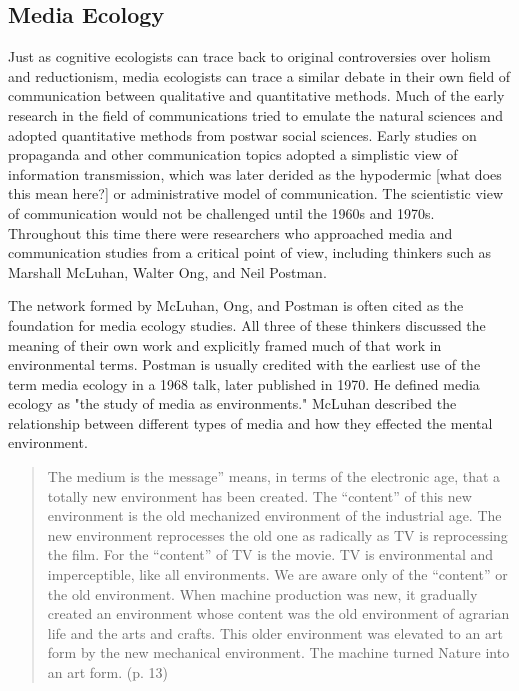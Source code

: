 \subsection{Media Ecology}

Just as cognitive ecologists can trace back to original controversies over holism and reductionism, media ecologists can trace a similar debate in their own field of communication between qualitative and quantitative methods. Much of the early research in the field of communications tried to emulate the natural sciences and adopted quantitative methods from postwar social sciences. Early studies on propaganda and other communication topics adopted a simplistic view of information transmission, which was later derided as the hypodermic [what does this mean here?] or administrative model of communication. The scientistic view of communication would not be challenged until the 1960s and 1970s. Throughout this time there were researchers who approached media and communication studies from a critical point of view, including thinkers such as Marshall McLuhan, Walter Ong, and Neil Postman.

The network formed by McLuhan, Ong, and Postman is often cited as the foundation for media ecology studies. All three of these thinkers discussed the meaning of their own work and explicitly framed much of that work in environmental terms. Postman is usually credited with the earliest use of the term media ecology in a 1968 talk, later published in 1970. He defined media ecology as "the study of media as environments." \citep{strate_media_2004} McLuhan described the relationship between different types of media and how they effected the mental environment.

\begin{quote}
The medium is the message” means, in terms of the electronic age, that a totally new environment has been created. The “content” of this new environment is the old mechanized environment of the industrial age. The new environment reprocesses the old one as radically as TV is reprocessing the film. For the “content” of TV is the movie. TV is environmental and imperceptible, like all environments. We are aware only of the “content” or the old environment. When machine production was new, it gradually created an environment whose content was the old environment of agrarian life and the arts and crafts. This older environment was elevated to an art form by the new mechanical environment. The machine turned Nature into an art form. \citep{mcluhan_understanding_2013} (p. 13)
\end{quote}

